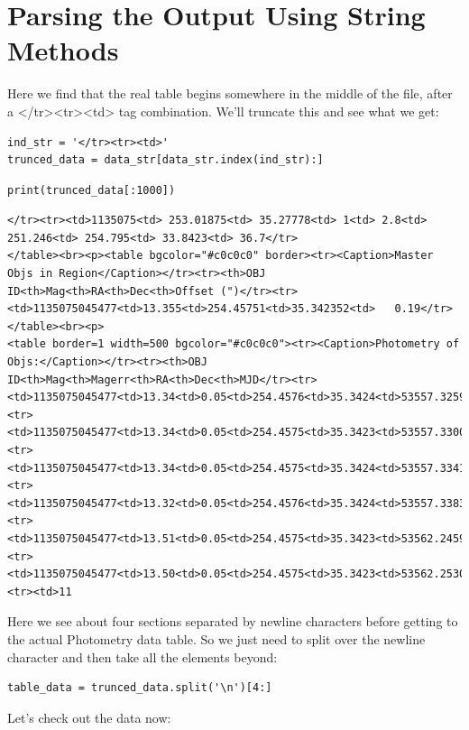 \documentclass[11pt]{article}
\begin{document}
\section*{Parsing the Output Using String Methods}
\label{sec-4}

Here we find that the real table begins somewhere in the middle of the file,
after a </tr><tr><td> tag combination. We'll truncate this and see what we get:

\begin{verbatim}
ind_str = '</tr><tr><td>'
trunced_data = data_str[data_str.index(ind_str):]
\end{verbatim}


\begin{verbatim}
print(trunced_data[:1000])
\end{verbatim}

\begin{verbatim}
</tr><tr><td>1135075<td> 253.01875<td> 35.27778<td> 1<td> 2.8<td> 251.246<td> 254.795<td> 33.8423<td> 36.7</tr>
</table><br><p><table bgcolor="#c0c0c0" border><tr><Caption>Master Objs in Region</Caption></tr><tr><th>OBJ ID<th>Mag<th>RA<th>Dec<th>Offset (")</tr><tr><td>1135075045477<td>13.355<td>254.45751<td>35.342352<td>   0.19</tr>
</table><br><p>
<table border=1 width=500 bgcolor="#c0c0c0"><tr><Caption>Photometry of Objs:</Caption></tr><tr><th>OBJ ID<th>Mag<th>Magerr<th>RA<th>Dec<th>MJD</tr><tr><td>1135075045477<td>13.34<td>0.05<td>254.4576<td>35.3424<td>53557.32593</tr>
<tr><td>1135075045477<td>13.34<td>0.05<td>254.4575<td>35.3423<td>53557.33004</tr>
<tr><td>1135075045477<td>13.34<td>0.05<td>254.4575<td>35.3424<td>53557.33418</tr>
<tr><td>1135075045477<td>13.32<td>0.05<td>254.4576<td>35.3424<td>53557.33834</tr>
<tr><td>1135075045477<td>13.51<td>0.05<td>254.4575<td>35.3423<td>53562.24598</tr>
<tr><td>1135075045477<td>13.50<td>0.05<td>254.4575<td>35.3423<td>53562.25304</tr>
<tr><td>11
\end{verbatim}

Here we see about four sections separated by newline characters before getting
to the actual Photometry data table. So we just need to split over the newline
character and then take all the elements beyond:

\begin{verbatim}
table_data = trunced_data.split('\n')[4:]
\end{verbatim}


Let's check out the data now:
\end{document}
